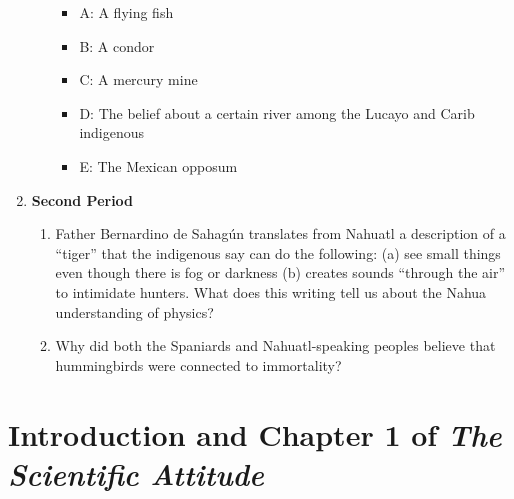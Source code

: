 \documentclass[12pt]{article}
\begin{document}
\begin{enumerate}
\begin{enumerate}
\begin{itemize}
\item A: A flying fish
\item B: A condor
\item C: A mercury mine
\item D: The belief about a certain river among the Lucayo and Carib indigenous
\item E: The Mexican opposum
\end{itemize}
\end{enumerate}
\item \textbf{Second Period}
\begin{enumerate}
\item Father Bernardino de Sahag\'{u}n translates from Nahuatl a description of a ``tiger'' that the indigenous say can do the following: (a) see small things even though there is fog or darkness (b) creates sounds 	``through the air'' to intimidate hunters.  What does this writing tell us about the Nahua understanding of physics? \\ \vspace{0.5cm}
\item Why did both the Spaniards and Nahuatl-speaking peoples believe that hummingbirds were connected to immortality? \\ \vspace{1cm}
\end{enumerate}
\end{enumerate}

\section{Introduction and Chapter 1 of \textit{The Scientific Attitude}}
\end{document}
